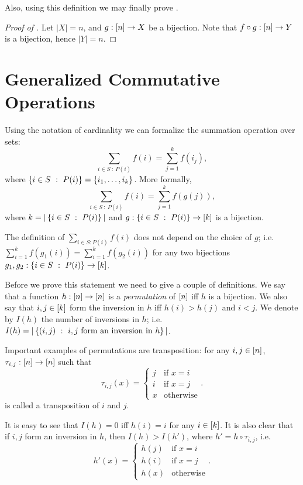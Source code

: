 Also, using this definition we may finally prove
.
\begin{proof}[Proof of ]
    Let $|X| = n$, and $g : {[{n}]} \to X$ be a bijection.
    Note that $f \circ g : {[{n}]} \to Y$ is a bijection, hence $|Y| = n$.
\end{proof}


\section{Generalized Commutative Operations}
\label{section:generalized-sum}
Using the notation of cardinality we can formalize the summation operation over
sets:
\[
    \sum_{i \in S ~:~ P(i)} f(i) = \sum_{j = 1}^k f(i_j),
\]
where $\set[P(i)]{i \in S} = \set{i_1, \dots, i_k}$. More formally,
\[
    \sum_{i \in S ~:~ P(i)} f(i) = \sum_{j = 1}^k f(g(j)),
\]
where $k = |\set[P(i)]{i \in S}|$ and $g : \set[P(i)]{i \in S} \to \range{k}$ is
a bijection.

\begin{theorem}
\label{theorem:sum-correctness}
    The definition of $\sum_{i \in S : P(i)} f(i)$ does not depend on the choice
    of $g$;
    i.e. $\sum_{i = 1}^k f(g_1(i)) = \sum_{i = 1}^k f(g_2(i))$
    for any two bijections $g_1, g_2 : \set[P(i)]{i \in S} \to \range{k}$.
\end{theorem}
Before we prove this statement we need to give a couple of definitions.
We say that a function $h : {[{n}]} \to {[{n}]}$ is a \emph{permutation} of
${[{n}]}$ iff $h$ is a bijection. We also say that
$i, j \in {[{k}]}$ form the inversion in $h$ iff $h(i) > h(j)$ and $i < j$.
We denote by $I(h)$ the number of inversions in $h$; i.e. $I(h) =
|\set[i, j \text{ form an inversion in } h]{(i, j)}|$.

Important examples of permutations are transposition: for any
$i, j \in {[{n}]}$, $\tau_{i, j} : {[{n}]} \to {[{n}]}$ such that
\[
    \tau_{i, j}(x) =
    \begin{cases}
        j & \text{if } x = i \\
        i & \text{if } x = j \\
        x & \text{otherwise}
    \end{cases}.
\]
is called a transposition of $i$ and $j$.

It is easy to see that $I(h) = 0$ iff $h(i) = i$ for any $i \in {[{k}]}$.
It is also clear that if $i, j$ form an inversion in $h$, then $I(h) > I(h')$,
where $h' = h \circ \tau_{i, j}$, i.e.
\[
    h'(x) =
    \begin{cases}
        h(j) & \text{if } x = i \\
        h(i) & \text{if } x = j \\
        h(x) & \text{otherwise}
    \end{cases}.
\]


